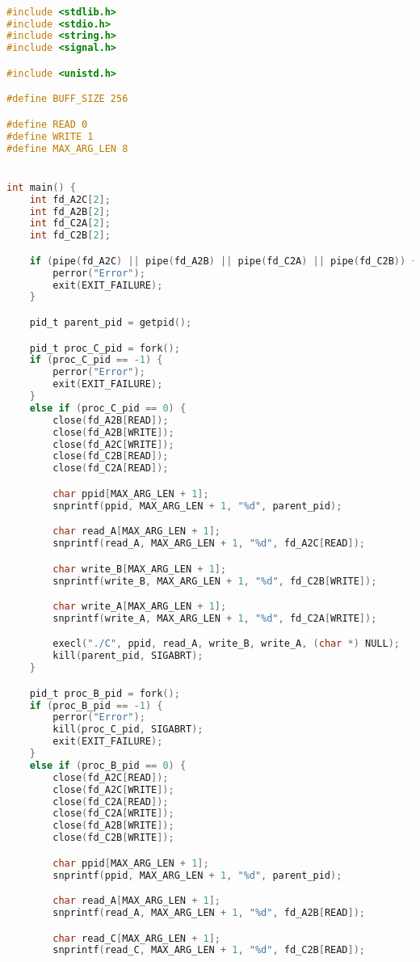 \begin{lstlisting}[language=C]

#include <stdlib.h>
#include <stdio.h>
#include <string.h>
#include <signal.h>

#include <unistd.h>

#define BUFF_SIZE 256

#define READ 0
#define WRITE 1
#define MAX_ARG_LEN 8


int main() {
    int fd_A2C[2];
    int fd_A2B[2];
    int fd_C2A[2];
    int fd_C2B[2];

    if (pipe(fd_A2C) || pipe(fd_A2B) || pipe(fd_C2A) || pipe(fd_C2B)) {
        perror("Error");
        exit(EXIT_FAILURE);
    }

    pid_t parent_pid = getpid();

    pid_t proc_C_pid = fork();
    if (proc_C_pid == -1) {
        perror("Error");
        exit(EXIT_FAILURE);
    }
    else if (proc_C_pid == 0) {
        close(fd_A2B[READ]);
        close(fd_A2B[WRITE]);
        close(fd_A2C[WRITE]);
        close(fd_C2B[READ]);
        close(fd_C2A[READ]);

        char ppid[MAX_ARG_LEN + 1];
        snprintf(ppid, MAX_ARG_LEN + 1, "%d", parent_pid);

        char read_A[MAX_ARG_LEN + 1];
        snprintf(read_A, MAX_ARG_LEN + 1, "%d", fd_A2C[READ]);

        char write_B[MAX_ARG_LEN + 1];
        snprintf(write_B, MAX_ARG_LEN + 1, "%d", fd_C2B[WRITE]);

        char write_A[MAX_ARG_LEN + 1];
        snprintf(write_A, MAX_ARG_LEN + 1, "%d", fd_C2A[WRITE]);

        execl("./C", ppid, read_A, write_B, write_A, (char *) NULL);
        kill(parent_pid, SIGABRT);
    }

    pid_t proc_B_pid = fork();
    if (proc_B_pid == -1) {
        perror("Error");
        kill(proc_C_pid, SIGABRT);
        exit(EXIT_FAILURE);
    }
    else if (proc_B_pid == 0) {
        close(fd_A2C[READ]);
        close(fd_A2C[WRITE]);
        close(fd_C2A[READ]);
        close(fd_C2A[WRITE]);
        close(fd_A2B[WRITE]);
        close(fd_C2B[WRITE]);

        char ppid[MAX_ARG_LEN + 1];
        snprintf(ppid, MAX_ARG_LEN + 1, "%d", parent_pid);

        char read_A[MAX_ARG_LEN + 1];
        snprintf(read_A, MAX_ARG_LEN + 1, "%d", fd_A2B[READ]);

        char read_C[MAX_ARG_LEN + 1];
        snprintf(read_C, MAX_ARG_LEN + 1, "%d", fd_C2B[READ]);


\end{lstlisting}
